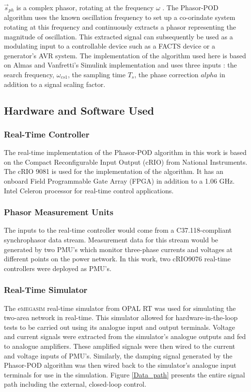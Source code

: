 \documentclass[conference]{IEEEtran}
\begin{document}
$\stackrel{\to }{s}_{ph}$ is a complex phasor, rotating at the frequency $\omega$ \cite{PhasorPOD}. The Phasor-POD algorithm uses the known oscillation frequency to set up a co-orindate system rotating at this frequency and continuously extracts a phasor representing the magnitude of oscillation\cite{PhasorPOD}. This extracted signal can subsequently be used as a modulating input to a controllable device such as a FACTS device or a generator's AVR system. The implementation of the algorithm used here is based on Almas and Vanfretti's Simulink implementation \cite{PhasorPODImplement} and uses three inputs : the search frequency, $\omega_{cs1}$, the sampling time $T_{s}$, the phase correction $alpha$ in addition to a signal scaling factor.\\

\subsection{Hardware and Software Used}
\subsubsection*{Real-Time Controller} The real-time implementation of the Phasor-POD algorithm in this work is based on the Compact Reconfigurable Input Output (cRIO) from National Instruments. The cRIO 9081 \cite{cRIO9081} is used for the implementation of the algorithm. It has an onboard Field Programmable Gate Array (FPGA) in addition to a 1.06 GHz. Intel Celeron processor for real-time control applications\cite{cRIO9081}.\\

\subsubsection*{Phasor Measurement Units}
The inputs to the real-time controller would come from a C37.118-compliant synchrophasor data stream. Measurement data for this stream would be generated by two PMU's which monitor three-phase currents and voltages at different points on the power network. In this work, two cRIO9076 real-time controllers \cite{cRIO9076} were deployed as PMU's.\\

\subsubsection*{Real-Time Simulator}
The e\textsc{megasim} real-time simulator from OPAL RT \cite{eMEGASIM} was used for simulating the two-area network in real-time. This simulator allowed for hardware-in-the-loop tests to be carried out using its analogue input and output terminals. Voltage and current signals were extracted from the simulator's analogue outputs and fed to analogue amplifiers. These amplified signals were then wired to the current and voltage inputs of PMU's. Similarly, the damping signal generated by the Phasor-POD algorithm was then wired back to the simulator's analogue input terminals for use in the simulation. Figure \ref{Data_path} presents the entire signal path including the external, closed-loop control.\\
\end{document}
